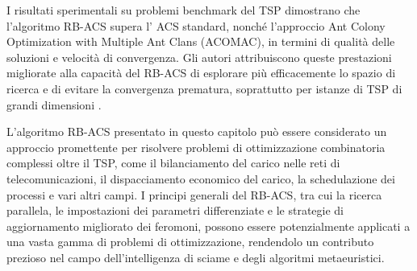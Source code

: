 I risultati sperimentali su problemi benchmark del \gls{TSP} dimostrano che l'algoritmo \gls{RB-ACS} supera l' \gls{ACS} standard, nonché l'approccio Ant Colony Optimization with Multiple Ant Clans (\gls{ACOMAC}), in termini di qualità delle soluzioni e velocità di convergenza. Gli autori attribuiscono queste prestazioni migliorate alla capacità del \gls{RB-ACS} di esplorare più efficacemente lo spazio di ricerca e di evitare la convergenza prematura, soprattutto per istanze di \gls{TSP} di grandi dimensioni \cite{Hassan2013}.

L'algoritmo \gls{RB-ACS} presentato in questo capitolo può essere considerato un approccio promettente per risolvere problemi di ottimizzazione combinatoria complessi oltre il  \gls{TSP}, come il bilanciamento del carico nelle reti di telecomunicazioni, il dispacciamento economico del carico, la schedulazione dei processi e vari altri campi. I principi generali del \gls{RB-ACS}, tra cui la ricerca parallela, le impostazioni dei parametri differenziate e le strategie di aggiornamento migliorato dei feromoni, possono essere potenzialmente applicati a una vasta gamma di problemi di ottimizzazione, rendendolo un contributo prezioso nel campo dell'intelligenza di sciame e degli algoritmi metaeuristici.

